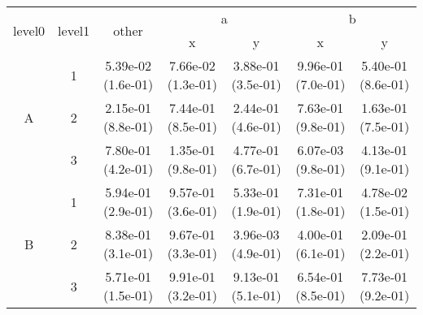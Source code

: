 \begin{tabular}{ccccccc}
\toprule
\multirow{2}{*}{level0} & \multirow{2}{*}{level1}& \multirow{2}{*}{other}&\multicolumn{2}{c}{a}&\multicolumn{2}{c}{b}\tabularnewline
\cmidrule(lr){4-5}
\cmidrule(lr){6-7}
&&&x&y&x&y\tabularnewline
\midrule
\multirow{3}{*}{A}&1& 5.39e-02 (1.6e-01)& 7.66e-02 (1.3e-01)& 3.88e-01 (3.5e-01)& 9.96e-01 (7.0e-01)& 5.40e-01 (8.6e-01)\tabularnewline
&2& 2.15e-01 (8.8e-01)& 7.44e-01 (8.5e-01)& 2.44e-01 (4.6e-01)& 7.63e-01 (9.8e-01)& 1.63e-01 (7.5e-01)\tabularnewline
&3& 7.80e-01 (4.2e-01)& 1.35e-01 (9.8e-01)& 4.77e-01 (6.7e-01)& 6.07e-03 (9.8e-01)& 4.13e-01 (9.1e-01)\tabularnewline
\midrule
\multirow{3}{*}{B}&1& 5.94e-01 (2.9e-01)& 9.57e-01 (3.6e-01)& 5.33e-01 (1.9e-01)& 7.31e-01 (1.8e-01)& 4.78e-02 (1.5e-01)\tabularnewline
&2& 8.38e-01 (3.1e-01)& 9.67e-01 (3.3e-01)& 3.96e-03 (4.9e-01)& 4.00e-01 (6.1e-01)& 2.09e-01 (2.2e-01)\tabularnewline
&3& 5.71e-01 (1.5e-01)& 9.91e-01 (3.2e-01)& 9.13e-01 (5.1e-01)& 6.54e-01 (8.5e-01)& 7.73e-01 (9.2e-01)\tabularnewline
\bottomrule
\end{tabular}
